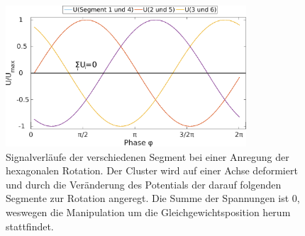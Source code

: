               \begin{figure}[!t]
                \centering
                \includegraphics[width=0.8\textwidth]{figs/auswertung/phasen/rotationsverlauf.png}
                \caption{Signalverläufe der verschiedenen Segment bei einer Anregung der hexagonalen Rotation. Der Cluster wird auf einer Achse deformiert und durch die Veränderung des Potentials der darauf folgenden Segmente zur Rotation angeregt. Die Summe der Spannungen ist 0, weswegen die Manipulation um die Gleichgewichtsposition herum stattfindet.}\label{img:signalverlauf}
              \end{figure}

